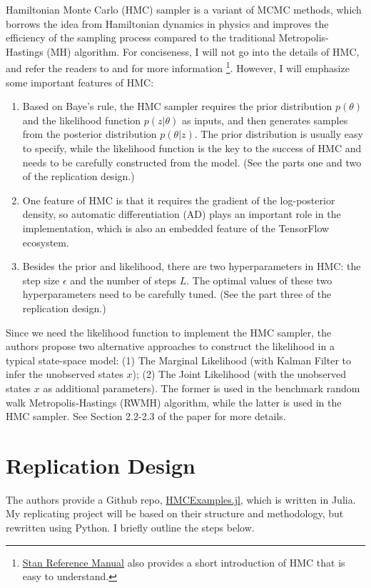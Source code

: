 \documentclass[12pt]{article}
\begin{document}
Hamiltonian Monte Carlo (HMC) sampler is a variant of MCMC methods, which borrows the idea from Hamiltonian dynamics in physics and improves the efficiency of the sampling process compared to the traditional Metropolis-Hastings (MH) algorithm. For conciseness, I will not go into the details of HMC, and refer the readers to \citet{gelman2013bayesian} and \citet{neal2011mcmc} for more information \footnote{\href{https://mc-stan.org/docs/reference-manual/hamiltonian-monte-carlo.html}{Stan Reference Manual} also provides a short introduction of HMC that is easy to understand.}. However, I will emphasize some important features of HMC:
\begin{enumerate}
    \item Based on Baye's rule, the HMC sampler requires the prior distribution $p(\theta)$ and the likelihood function $p(z|\theta)$ as inputs, and then generates samples from the posterior distribution $p(\theta|z)$. The prior distribution is usually easy to specify, while the likelihood function is the key to the success of HMC and needs to be carefully constructed from the model. (See the parts one and two of the replication design.)
    \item One feature of HMC is that it requires the gradient of the log-posterior density, so automatic differentiation (AD) plays an important role in the implementation, which is also an embedded feature of the TensorFlow ecosystem.
    \item Besides the prior and likelihood, there are two hyperparameters in HMC: the step size $\epsilon$ and the number of steps $L$. The optimal values of these two hyperparameters need to be carefully tuned. (See the part three of the replication design.)
\end{enumerate}

Since we need the likelihood function to implement the HMC sampler, the authors propose two alternative approaches to construct the likelihood in a typical state-space model: (1) The Marginal Likelihood (with Kalman Filter to infer the unobserved states $x$); (2) The Joint Likelihood (with the unobserved states $x$ as additional parameters). The former is used in the benchmark random walk Metropolis-Hastings (RWMH) algorithm, while the latter is used in the HMC sampler. See Section 2.2-2.3 of the paper for more details.

\section{Replication Design}
The authors provide a Github repo, \href{https://github.com/HighDimensionalEconLab/HMCExamples.jl}{HMCExamples.jl}, which is written in Julia. My replicating project will be based on their structure and methodology, but rewritten using Python. I briefly outline the steps below.
\end{document}
